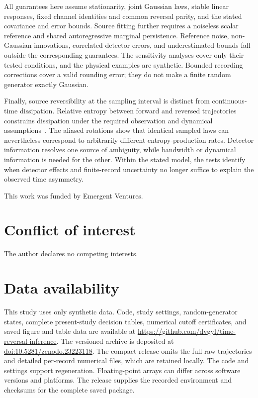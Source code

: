 \documentclass[aps,pre,reprint,floatfix,superscriptaddress,nofootinbib]{revtex4-2}
\begin{document}
All guarantees here assume stationarity, joint Gaussian laws, stable linear responses, fixed channel identities and common reversal parity, and the stated covariance and error bounds. Source fitting further requires a noiseless scalar reference and shared autoregressive marginal persistence. Reference noise, non-Gaussian innovations, correlated detector errors, and underestimated bounds fall outside the corresponding guarantees. The sensitivity analyses cover only their tested conditions, and the physical examples are synthetic. Bounded recording corrections cover a valid rounding error; they do not make a finite random generator exactly Gaussian.

Finally, source reversibility at the sampling interval is distinct from continuous-time dissipation. Relative entropy between forward and reversed trajectories constrains dissipation under the required observation and dynamical assumptions~\cite{seifert2012,lucenteinference2022,ohgaasymmetry2023}. The aliased rotations show that identical sampled laws can nevertheless correspond to arbitrarily different entropy-production rates. Detector information resolves one source of ambiguity, while bandwidth or dynamical information is needed for the other. Within the stated model, the tests identify when detector effects and finite-record uncertainty no longer suffice to explain the observed time asymmetry.

\appendix

\begin{acknowledgments}
This work was funded by Emergent Ventures.
\end{acknowledgments}
\section*{Conflict of interest}
The author declares no competing interests.
\section*{Data availability}
This study uses only synthetic data. Code, study settings, random-generator states, complete present-study decision tables, numerical cutoff certificates, and saved figure and table data are available at \url{https://github.com/dvgyl/time-reversal-inference}. The versioned archive is deposited at \href{https://doi.org/10.5281/zenodo.23223118}{doi:10.5281/zenodo.23223118}. The compact release omits the full raw trajectories and detailed per-record numerical files, which are retained locally. The code and settings support regeneration. Floating-point arrays can differ across software versions and platforms. The release supplies the recorded environment and checksums for the complete saved package.
\clearpage

\end{document}
